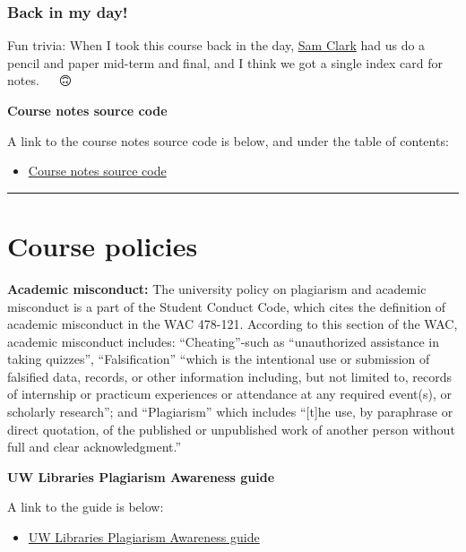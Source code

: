 \documentclass[
]{book}
\providecommand{\tightlist}{%
  \setlength{\itemsep}{0pt}\setlength{\parskip}{0pt}}
\begin{document}
\hypertarget{back-in-my-day}{%
\subsubsection*{Back in my day!}\label{back-in-my-day}}

Fun trivia: When I took this course back in the day, \href{https://sociology.osu.edu/people/clark.2962}{Sam Clark} had us do a pencil and paper mid-term and final, and I think we got a single index card for notes. 🙂 🤣 🙃

\textbf{Course notes source code}

A link to the course notes source code is below, and under the table of contents:

\begin{itemize}
\tightlist
\item
  \href{https://github.com/hanowell/uwsoc533a}{Course notes source code}
\end{itemize}

\begin{center}\rule{0.5\linewidth}{0.5pt}\end{center}

\hypertarget{course-policies}{%
\section*{Course policies}\label{course-policies}}

\textbf{Academic misconduct:} The university policy on plagiarism and academic misconduct is a part of the Student Conduct Code, which cites the definition of academic misconduct in the WAC 478-121. According to this section of the WAC, academic misconduct includes: ``Cheating''-such as ``unauthorized assistance in taking quizzes'', ``Falsification'' ``which is the intentional use or submission of falsified data, records, or other information including, but not limited to, records of internship or practicum experiences or attendance at any required event(s), or scholarly research''; and ``Plagiarism'' which includes ``{[}t{]}he use, by paraphrase or direct quotation, of the published or unpublished work of another person without full and clear acknowledgment.''

\textbf{UW Libraries Plagiarism Awareness guide}

A link to the guide is below:

\begin{itemize}
\tightlist
\item
  \href{https://www.lib.washington.edu/teaching/plagiarism}{UW Libraries Plagiarism Awareness guide}
\end{itemize}
\end{document}
